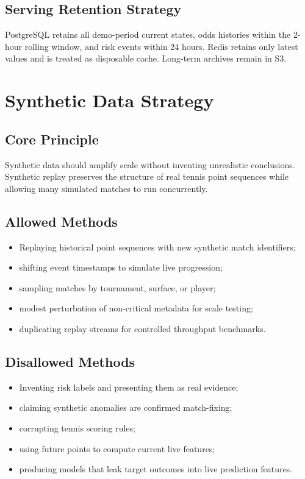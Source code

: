 \documentclass[11pt,a4paper]{article}
\begin{document}
\subsection{Serving Retention Strategy}

PostgreSQL retains all demo-period current states, odds histories within the 2-hour rolling
window, and risk events within 24 hours. Redis retains only latest values and is treated as
disposable cache. Long-term archives remain in S3.

\section{Synthetic Data Strategy}

\subsection{Core Principle}

Synthetic data should amplify scale without inventing unrealistic conclusions. Synthetic replay
preserves the structure of real tennis point sequences while allowing many simulated matches to
run concurrently.

\subsection{Allowed Methods}

\begin{itemize}[nosep]
  \item Replaying historical point sequences with new synthetic match identifiers;
  \item shifting event timestamps to simulate live progression;
  \item sampling matches by tournament, surface, or player;
  \item modest perturbation of non-critical metadata for scale testing;
  \item duplicating replay streams for controlled throughput benchmarks.
\end{itemize}

\subsection{Disallowed Methods}

\begin{itemize}[nosep]
  \item Inventing risk labels and presenting them as real evidence;
  \item claiming synthetic anomalies are confirmed match-fixing;
  \item corrupting tennis scoring rules;
  \item using future points to compute current live features;
  \item producing models that leak target outcomes into live prediction features.
\end{itemize}
\end{document}
